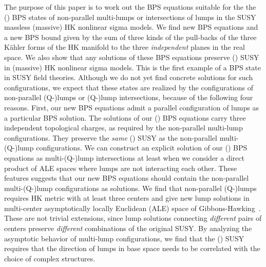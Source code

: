 \documentclass[a4paper,12pt]{article}
\providecommand{\kahler}{K\"{a}hler }
\begin{document}
The purpose of this paper is to work out the BPS equations suitable for the 
the \coordHE{} (\coordHE{}) BPS states of non-parallel multi-lumps or 
intersections of lumps in the \coordHE{} SUSY massless (massive) HK 
nonlinear sigma models. 
We find new BPS equations and 
a new BPS bound given by 
the sum of three kinds of the pull-backs 
of the three \kahler forms of the HK manifold to 
the three {\it independent} planes in the real space.  
We also show that any solutions of these BPS equations 
preserve \coordHE{} (\coordHE{}) SUSY in (massive) HK nonlinear sigma models.  
This is the first example of a \coordHE{} BPS state 
in \coordHE{} SUSY field theories. 
Although we do not yet find concrete solutions for such configurations, 
we expect that these states are realized by the configurations 
of non-parallel (Q-)lumps or (Q-)lump intersections, because of the 
following four reasons. 
 First, our new BPS equations admit a parallel configuration of lumps 
 as a particular \coordHE{} BPS solution. 
The solutions of our \coordHE{} (\coordHE{}) BPS equations 
carry three independent topological charges, as 
required by the non-parallel multi-lump configurations.  
They preserve the {\it same} \coordHE{} (\coordHE{}) 
SUSY as the non-parallel multi-(Q-)lump configurations. 
We can construct an explicit solution of our \coordHE{} (\coordHE{}) BPS equations 
as multi-(Q-)lump intersections at least when we consider a direct 
product of ALE spaces where lumps are not interacting each other. 
These features suggests that our new BPS equations should contain 
 the non-parallel multi-(Q-)lump configurations as solutions.  
We find that non-parallel (Q-)lumps requires HK metric with 
at least three centers and 
give new lump solutions in multi-center 
asymptotically locally Euclidean 
(ALE) space of Gibbons-Hawking~\cite{GH}. 
These are not trivial extensions, since 
lump solutions connecting {\it different} pairs of centers 
preserve {\it different} combinations of the original SUSY. 
By analyzing the asymptotic behavior of multi-lump configurations, 
we find that the \coordHE{} (\coordHE{}) SUSY requires that 
the direction of lumps in base space needs to be correlated with 
the choice of complex structures. 
\end{document}
